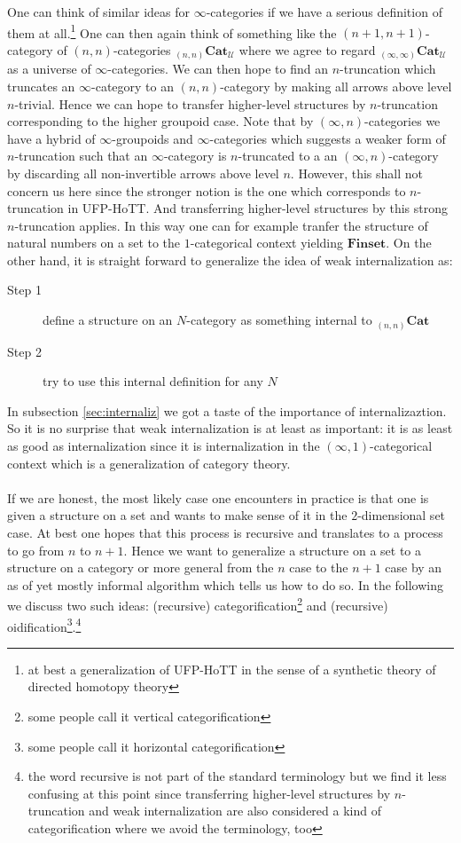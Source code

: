 One can think of similar ideas for $\infty$-categories if we have a serious definition of them at all.\footnote{at best a generalization of UFP-HoTT in the sense of a synthetic theory of directed homotopy theory} One can then again think of something like the $(n+1,n+1)$-category of $(n,n)$-categories ${}_{(n,n)}\mathbf{Cat}_{\mathcal{U}}$ where we agree to regard ${}_{(\infty,\infty)}\mathbf{Cat}_{\mathcal{U}}$ as a universe of $\infty$-categories. We can then hope to find an $n$-truncation which truncates an $\infty$-category to an $(n,n)$-category by making all arrows above level $n$-trivial. Hence we can hope to transfer higher-level structures by $n$-truncation corresponding to the higher groupoid case. Note that by $(\infty,n)$-categories we have a hybrid of $\infty$-groupoids and $\infty$-categories which suggests a weaker form of $n$-truncation such that an $\infty$-category is $n$-truncated to a an $(\infty,n)$-category by discarding all non-invertible arrows above level $n$. However, this shall not concern us here since the stronger notion is the one which corresponds to $n$-truncation in UFP-HoTT. And transferring higher-level structures by this strong $n$-truncation applies. In this way one can for example tranfer the structure of natural numbers on a set to the $1$-categorical context yielding $\mathbf{Finset}$. On the other hand, it is straight forward to generalize the idea of weak internalization as:
\begin{description}
\item[Step 1]
define a structure on an $N$-category as something internal to ${}_{(n,n)}\mathbf{Cat}$
\item[Step 2]
try to use this internal definition for any $N$
\end{description}
In subsection \ref{sec:internaliz} we got a taste of the importance of internalizaztion. So it is no surprise that weak internalization is at least as important: it is as least as good as internalization since it is internalization in the $(\infty,1)$-categorical context which is a generalization of category theory.
\\\\
If we are honest, the most likely case one encounters in practice is that one is given a structure on a set and wants to make sense of it in the $2$-dimensional set case. At best one hopes that this process is recursive and translates to a process to go from $n$ to $n+1$. Hence we want to generalize a structure on a set to a structure on a category or more general from the $n$ case to the $n+1$ case by an as of yet mostly informal algorithm which tells us how to do so. In the following we discuss two such ideas: (recursive) categorification\footnote{some people call it vertical categorification} and (recursive) oidification\footnote{some people call it horizontal categorification}.\footnote{the word recursive is not part of the standard terminology but we find it less confusing at this point since transferring higher-level structures by $n$-truncation and weak internalization are also considered a kind of categorification where we avoid the terminology, too}
